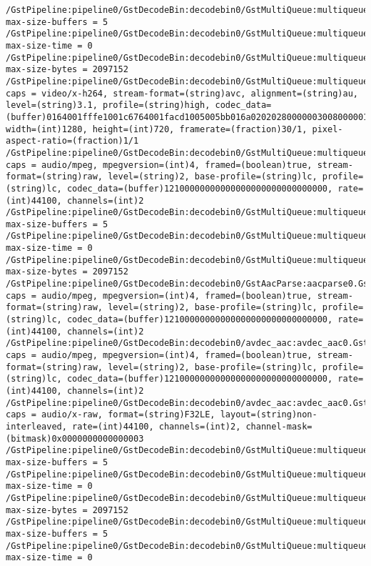 \documentclass[12pt,oneside]{book}
\begin{document}
\begin{lstlisting}
/GstPipeline:pipeline0/GstDecodeBin:decodebin0/GstMultiQueue:multiqueue0: max-size-buffers = 5
/GstPipeline:pipeline0/GstDecodeBin:decodebin0/GstMultiQueue:multiqueue0: max-size-time = 0
/GstPipeline:pipeline0/GstDecodeBin:decodebin0/GstMultiQueue:multiqueue0: max-size-bytes = 2097152
/GstPipeline:pipeline0/GstDecodeBin:decodebin0/GstMultiQueue:multiqueue0.GstMultiQueuePad:sink_0: caps = video/x-h264, stream-format=(string)avc, alignment=(string)au, level=(string)3.1, profile=(string)high, codec_data=(buffer)0164001fffe1001c6764001facd1005005bb016a02020280000003008000001e078c188901000468eb8f2c, width=(int)1280, height=(int)720, framerate=(fraction)30/1, pixel-aspect-ratio=(fraction)1/1
/GstPipeline:pipeline0/GstDecodeBin:decodebin0/GstMultiQueue:multiqueue0.GstMultiQueuePad:sink_1: caps = audio/mpeg, mpegversion=(int)4, framed=(boolean)true, stream-format=(string)raw, level=(string)2, base-profile=(string)lc, profile=(string)lc, codec_data=(buffer)12100000000000000000000000000000, rate=(int)44100, channels=(int)2
/GstPipeline:pipeline0/GstDecodeBin:decodebin0/GstMultiQueue:multiqueue0: max-size-buffers = 5
/GstPipeline:pipeline0/GstDecodeBin:decodebin0/GstMultiQueue:multiqueue0: max-size-time = 0
/GstPipeline:pipeline0/GstDecodeBin:decodebin0/GstMultiQueue:multiqueue0: max-size-bytes = 2097152
/GstPipeline:pipeline0/GstDecodeBin:decodebin0/GstAacParse:aacparse0.GstPad:src: caps = audio/mpeg, mpegversion=(int)4, framed=(boolean)true, stream-format=(string)raw, level=(string)2, base-profile=(string)lc, profile=(string)lc, codec_data=(buffer)12100000000000000000000000000000, rate=(int)44100, channels=(int)2
/GstPipeline:pipeline0/GstDecodeBin:decodebin0/avdec_aac:avdec_aac0.GstPad:sink: caps = audio/mpeg, mpegversion=(int)4, framed=(boolean)true, stream-format=(string)raw, level=(string)2, base-profile=(string)lc, profile=(string)lc, codec_data=(buffer)12100000000000000000000000000000, rate=(int)44100, channels=(int)2
/GstPipeline:pipeline0/GstDecodeBin:decodebin0/avdec_aac:avdec_aac0.GstPad:src: caps = audio/x-raw, format=(string)F32LE, layout=(string)non-interleaved, rate=(int)44100, channels=(int)2, channel-mask=(bitmask)0x0000000000000003
/GstPipeline:pipeline0/GstDecodeBin:decodebin0/GstMultiQueue:multiqueue0: max-size-buffers = 5
/GstPipeline:pipeline0/GstDecodeBin:decodebin0/GstMultiQueue:multiqueue0: max-size-time = 0
/GstPipeline:pipeline0/GstDecodeBin:decodebin0/GstMultiQueue:multiqueue0: max-size-bytes = 2097152
/GstPipeline:pipeline0/GstDecodeBin:decodebin0/GstMultiQueue:multiqueue0: max-size-buffers = 5
/GstPipeline:pipeline0/GstDecodeBin:decodebin0/GstMultiQueue:multiqueue0: max-size-time = 0

\end{lstlisting}
\end{document}
